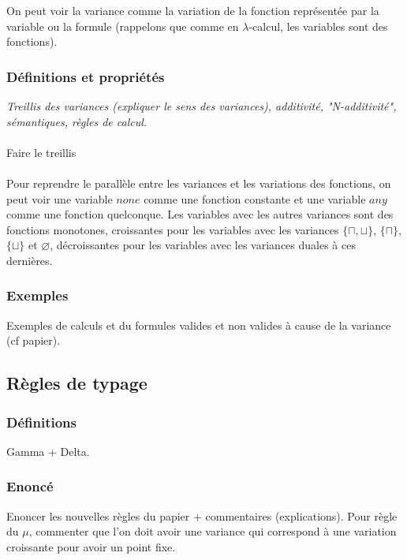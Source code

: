 \documentclass[11pt,a4paper]{article}
\begin{document}
On peut voir la variance comme la variation de la fonction représentée par la variable ou la formule (rappelons que comme en $\lambda$-calcul, les variables sont des fonctions). \color{black}  

\subsubsection{Définitions et propriétés}

\textit{Treillis des variances (expliquer le sens des variances), additivité, "N-additivité", sémantiques, règles de calcul.}
\\\\

Faire le treillis
\\\\

\color{red}
Pour reprendre le parallèle entre les variances et les variations des fonctions, on peut voir une variable $none$ comme une fonction constante et une variable $any$ comme une fonction quelconque. Les variables avec les autres variances sont des fonctions monotones, croissantes pour les variables avec les variances $\{\sqcap, \sqcup\}$, $\{\sqcap\}$, $\{\sqcup\}$ et $\varnothing$, décroissantes pour les variables avec les variances duales à ces dernières. \color{black}


\subsubsection{Exemples}

Exemples de calculs et du formules valides et non valides à cause de la variance (cf papier).

\subsection{Règles de typage}

\subsubsection{Définitions}

Gamma + Delta.

\subsubsection{Enoncé}

Enoncer les nouvelles règles du papier + commentaires (explications). \color{red} Pour règle du $\mu$, commenter que l'on doit avoir une variance qui correspond à une variation croissante pour avoir un point fixe. \color{black}
\end{document}
